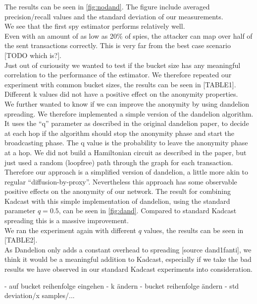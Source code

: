 The results can be seen in \ref{fig:nodand}. The figure include averaged
precision/recall values and the standard deviation of our measurements. \\
We see that the first spy estimator performs relatively well. \\
Even with an amount of as low as 20\% of spies, the attacker can
map over half of the sent transactions correctly. This is very far from
the best case scenario [TODO which is?]. \\

Just out of curiousity we wanted to test if the bucket size has any
meaningful correlation to the performance of the estimator. We therefore
repeated our experiment with common bucket sizes, the results can be
seen in [TABLE1].
Different k values did not have a positive effect on the anonymity
properties. \\

We further wanted to know if we can improve the anonymity by using dandelion spreading.
We therefore implemented a simple version of the dandelion algorithm. It
uses the ``q'' parameter as described in the original dandelion paper,
to decide at each hop if the algorithm should stop the anonymity phase
and start the broadcasting phase. The q value is the probability to leave
the anonymity phase at a hop. We did not build a Hamiltonian circuit as
described in the paper, but just used a random (loopfree) path through
the graph for each transaction. Therefore our approach is a simplified
version of dandelion, a little more akin to regular
``diffusion-by-proxy''. Nevertheless this approach has some observable
positive effects on the anonymity of our network. The result for
combining Kadcast with this simple implementation of dandelion, using
the standard parameter $q = 0.5$, can be seen in \ref{fig:dand}. Compared to
standard Kadcast spreading this is a massive improvement. \\
We ran the experiment again with different $q$ values, the results can
be seen in [TABLE2]. \\
As Dandelion only adds a constant overhead to spreading [source
dand1fanti], we think it would be a meaningful addition to Kadcast,
especially if we take the bad results we have observed in our standard
Kadcast experiments into consideration.


- auf bucket reihenfolge eingehen
- k ändern
- bucket reihenfolge ändern
- std deviation/x samples/...
